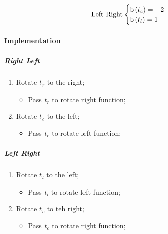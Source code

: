     \begin{equation}
      \text{Left Right}
      \begin{cases}
        \operatorname{b} \left( t_{c} \right) = -2 \\ 
        \operatorname{b} \left( t_{l} \right) = 1 
      \end{cases}
    \end{equation}
    
    \paragraph{Implementation}
    
    \subparagraph{Right Left}
    \begin{enumerate}
      \item Rotate $ t_{r} $ to the right;
      \begin{itemize}
        \item Pass $ t_{r} $ to rotate right function;
      \end{itemize}
      
      \item Rotate $ t_{c} $ to the left;
      \begin{itemize}
        \item Pass $ t_{c} $ to rotate left function;
      \end{itemize}
    \end{enumerate}
    
    \subparagraph{Left Right}
    \begin{enumerate}
      \item Rotate $ t_{l} $ to the left;
      \begin{itemize}
        \item Pass $ t_{l} $ to rotate left function; 
      \end{itemize}
      
      \item Rotate $ t_{c} $ to teh right;
      \begin{itemize}
        \item Pass $ t_{c} $ to rotate right function; 
      \end{itemize}
      
    \end{enumerate}